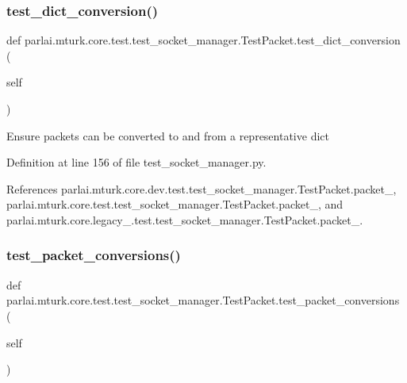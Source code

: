 \subsubsection{\texorpdfstring{test\+\_\+dict\+\_\+conversion()}{test\_dict\_conversion()}}
{\footnotesize\ttfamily def parlai.\+mturk.\+core.\+test.\+test\+\_\+socket\+\_\+manager.\+Test\+Packet.\+test\+\_\+dict\+\_\+conversion (\begin{DoxyParamCaption}\item[{}]{self }\end{DoxyParamCaption})}

\begin{DoxyVerb}Ensure packets can be converted to and from a representative dict\end{DoxyVerb}
 

Definition at line 156 of file test\+\_\+socket\+\_\+manager.\+py.



References parlai.\+mturk.\+core.\+dev.\+test.\+test\+\_\+socket\+\_\+manager.\+Test\+Packet.\+packet\+\_, parlai.\+mturk.\+core.\+test.\+test\+\_\+socket\+\_\+manager.\+Test\+Packet.\+packet\+\_, and parlai.\+mturk.\+core.\+legacy\+\_.\+test.\+test\+\_\+socket\+\_\+manager.\+Test\+Packet.\+packet\+\_.

\mbox{\label{classparlai_1_1mturk_1_1core_1_1test_1_1test__socket__manager_1_1TestPacket_a6336e783e860361ac933d5737298d26f}} 
\subsubsection{\texorpdfstring{test\+\_\+packet\+\_\+conversions()}{test\_packet\_conversions()}}
{\footnotesize\ttfamily def parlai.\+mturk.\+core.\+test.\+test\+\_\+socket\+\_\+manager.\+Test\+Packet.\+test\+\_\+packet\+\_\+conversions (\begin{DoxyParamCaption}\item[{}]{self }\end{DoxyParamCaption})}

